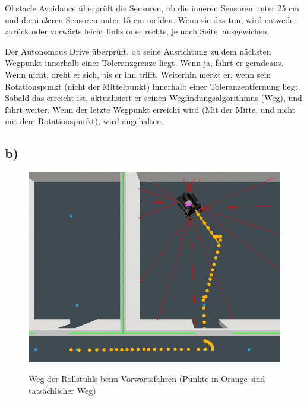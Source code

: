 \documentclass{../Vorlage/mat}
\begin{document}
Obstacle Avoidance überprüft die Sensoren, ob die inneren Sensoren unter 25 cm und die äußeren Sensoren unter 15 cm melden. Wenn sie das tun, wird entweder zurück oder vorwärts leicht links oder rechts, je nach Seite, ausgewichen.

Der Autonomous Drive überprüft, ob seine Ausrichtung zu dem nächsten Wegpunkt innerhalb einer Toleranzgrenze liegt. Wenn ja, fährt er geradeaus. Wenn nicht, dreht er sich, bis er ihn trifft. Weiterhin merkt er, wenn sein Rotationspunkt (nicht der Mittelpunkt) innerhalb einer Toleranzentfernung liegt. Sobald das erreicht ist, aktualisiert er seinen  Wegfindungsalgorithmus (Weg), und fährt weiter. Wenn der letzte Wegpunkt erreicht wird (Mit der Mitte, und nicht mit dem Rotationspunkt), wird angehalten.
\newpage
\subsection*{b)}
\begin{figure}[!htbp]
\centering
\includegraphics[scale=0.3]{forwards}
\label{fig:aufgabe2b1}
\caption{Weg der Rollstuhls beim Vorwärtsfahren (Punkte in Orange sind tatsächlicher Weg)}
\end{figure}
\end{document}
